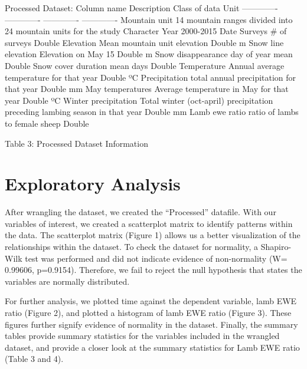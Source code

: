 \documentclass[
  12pt,
]{article}
\begin{document}
Processed Dataset: Column name \textbar{} Description \textbar{} Class
of data \textbar{} Unit ------------- \textbar{} -------------
\textbar{} ------------- \textbar{} ------------- Mountain unit
\textbar{} 14 mountain ranges divided into 24 mountain units for the
study \textbar{} Character \textbar{} Year \textbar{} 2000-2015
\textbar{} Date \textbar{} Surveys \textbar{} \# of surveys
\textbar Double \textbar{} Elevation\textbar{} Mean mountain unit
elevation \textbar{} Double \textbar{} m Snow line elevation \textbar{}
Elevation on May 15 \textbar{} Double \textbar{} m Snow disappearance
\textbar{} day of year mean \textbar{} Double \textbar{} Snow cover
duration \textbar{} mean days \textbar{} Double \textbar{} Temperature
\textbar{} Annual average temperature for that year \textbar{} Double
\textbar{} ºC Precipitation \textbar{} total annual precipitation for
that year \textbar{} Double \textbar{} mm May temperatures \textbar{}
Average temperature in May for that year \textbar{} Double \textbar{} ºC
Winter precipitation \textbar{} Total winter (oct-april) precipitation
preceding lambing season in that year \textbar{} Double \textbar{} mm
Lamb ewe ratio \textbar{} ratio of lambs to female sheep \textbar{}
Double \textbar{}

Table 3: Processed Dataset Information

\newpage

\hypertarget{exploratory-analysis}{%
\section{Exploratory Analysis}\label{exploratory-analysis}}

After wrangling the dataset, we created the ``Processed'' datafile. With
our variables of interest, we created a scatterplot matrix to identify
patterns within the data. The scatterplot matrix (Figure 1) allows us a
better visualization of the relationships within the dataset. To check
the dataset for normality, a Shapiro-Wilk test was performed and did not
indicate evidence of non-normality (W= 0.99606, p=0.9154). Therefore, we
fail to reject the null hypothesis that states the variables are
normally distributed.

For further analysis, we plotted time against the dependent variable,
lamb EWE ratio (Figure 2), and plotted a histogram of lamb EWE ratio
(Figure 3). These figures further signify evidence of normality in the
dataset. Finally, the summary tables provide summary statistics for the
variables included in the wrangled dataset, and provide a closer look at
the summary statistics for Lamb EWE ratio (Table 3 and 4).
\end{document}
